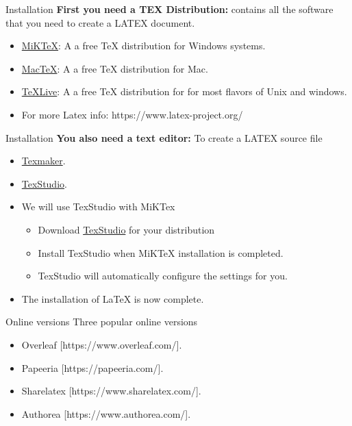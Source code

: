 \documentclass[handout]{beamer}
\begin{document}
\begin{darkframes}
   
   
   \begin{frame}[<+->]{Installation}
   	\textbf{First you need a TEX Distribution:} contains all the software that you need to create a LATEX document.
   	\begin{itemize}
   		\item \href{http://miktex.org/}{MiKTeX}: A a free TeX distribution for Windows systems.
   		\item \href{http://www.tug.org/mactex/}{MacTeX}: A a free TeX distribution for Mac.
   		\item \href{https://www.tug.org/texlive/}{TeXLive}: A a free TeX distribution for for most flavors of Unix and windows.
   		\item  For more Latex info: https://www.latex-project.org/
   	\end{itemize}
   	
   \end{frame}
   
   
   \begin{frame}[<+->]{Installation}
   	\textbf{You also need a text editor:} To create a LATEX source file
   	\begin{itemize}
   		\item \href{http://www.xm1math.net/texmaker/}{Texmaker}.
   		\item \href{http://www.texstudio.org/}{TexStudio}.
   		\item We will use TexStudio with MiKTex
   		\begin{itemize}
   			\item Download \href{http://www.texstudio.org/}{TexStudio} for your distribution
   			\item Install TexStudio when MiKTeX installation is completed.
   			\item TexStudio will automatically configure the settings for you.
   		\end{itemize}
   		\item The installation of LaTeX is now complete.
   	\end{itemize}
   \end{frame}
   
   \begin{frame}[<+->]{Online versions}
   	Three popular online versions
   	\begin{itemize}
   		\item Overleaf [https://www.overleaf.com/].
   		\item Papeeria [https://papeeria.com/].
   		\item Sharelatex [https://www.sharelatex.com/].
   		\item Authorea [https://www.authorea.com/].
   	\end{itemize}
   \end{frame}


\end{darkframes}
\end{document}
